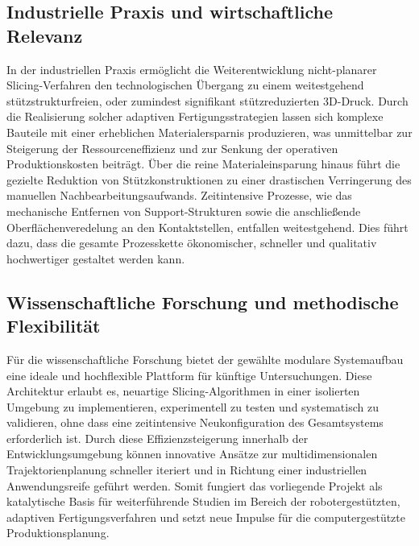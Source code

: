     \subsection{Industrielle Praxis und wirtschaftliche Relevanz}\label{subsec:industrial-practice and-economic-relevance}
      In der industriellen Praxis ermöglicht die Weiterentwicklung nicht-planarer Slicing-Verfahren den technologischen Übergang zu einem weitestgehend stützstrukturfreien, oder zumindest signifikant stützreduzierten 3D-Druck.
      Durch die Realisierung solcher adaptiven Fertigungsstrategien lassen sich komplexe Bauteile mit einer erheblichen Materialersparnis produzieren, was unmittelbar zur Steigerung der Ressourceneffizienz und zur Senkung der operativen Produktionskosten beiträgt.
      Über die reine Materialeinsparung hinaus führt die gezielte Reduktion von Stützkonstruktionen zu einer drastischen Verringerung des manuellen Nachbearbeitungsaufwands.
      Zeitintensive Prozesse, wie das mechanische Entfernen von Support-Strukturen sowie die anschließende Oberflächenveredelung an den Kontaktstellen, entfallen weitestgehend.
      Dies führt dazu, dass die gesamte Prozesskette ökonomischer, schneller und qualitativ hochwertiger gestaltet werden kann.

    \subsection{Wissenschaftliche Forschung und methodische Flexibilität}\label{subsec:scientific-research-and-methodical-flexibility}
      Für die wissenschaftliche Forschung bietet der gewählte modulare Systemaufbau eine ideale und hochflexible Plattform für künftige Untersuchungen.
      Diese Architektur erlaubt es, neuartige Slicing-Algorithmen in einer isolierten Umgebung zu implementieren, experimentell zu testen und systematisch zu validieren, ohne dass eine zeitintensive Neukonfiguration des Gesamtsystems erforderlich ist.
      Durch diese Effizienzsteigerung innerhalb der Entwicklungsumgebung können innovative Ansätze zur multidimensionalen Trajektorienplanung schneller iteriert und in Richtung einer industriellen Anwendungsreife geführt werden.
      Somit fungiert das vorliegende Projekt als katalytische Basis für weiterführende Studien im Bereich der robotergestützten, adaptiven Fertigungsverfahren und setzt neue Impulse für die computergestützte Produktionsplanung.

